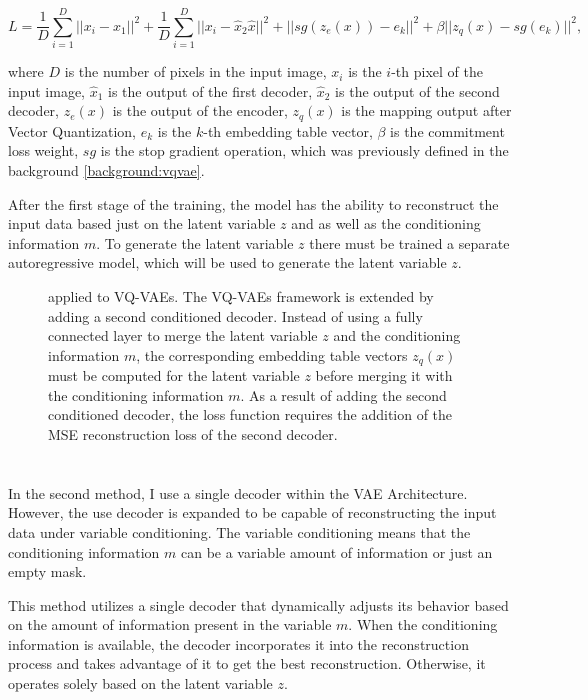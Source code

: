 \[ L = \frac{1}{D} \sum_{i=1}^{D} ||x_i - \hat{x}_1 ||^2 + \frac{1}{D} \sum_{i=1}^{D} || x_i - \hat{x}_2 \hat{x} ||^2 + || sg(z_e(x)) - e_k ||^2 + \beta || z_q(x) - sg(e_k) ||^2 , \]

where $D$ is the number of pixels in the input image, $x_i$ is the $i$-th pixel
of the input image, $\hat{x}_1$ is the output of the first decoder, $\hat{x}_2$
is the output of the second decoder, $z_e(x)$ is the output of the encoder,
$z_q(x)$ is the mapping output after Vector Quantization, $e_k$ is the $k$-th
embedding table vector, $\beta$ is the commitment loss weight, $sg$ is the stop
gradient operation, which was previously defined in the background \autoref{background:vqvae}.

After the first stage of the training, the model has the ability to reconstruct
the input data based just on the latent variable $z$ and as well as the
conditioning information $m$. To generate the latent variable $z$ there must be
trained a separate autoregressive model, which will be used to generate the
latent variable $z$.

\begin{figure}[H]
    \centering
    
    \caption[ applied to VQ-VAEs.]%
    {
         applied to VQ-VAEs. The VQ-VAEs framework is extended by adding a second conditioned decoder. Instead of using a fully connected layer to merge the latent variable $z$ and the conditioning information $m$, the corresponding embedding table vectors $z_q(x)$ must be computed for the latent variable $z$ before merging it with the conditioning information $m$. As a result of adding the second conditioned decoder, the loss function requires the addition of the MSE reconstruction loss of the second decoder.
    }\label{SCVQVAE2DFigure}
\end{figure}

\section{}

In the second method, I use a single decoder within the VAE Architecture.
However, the use decoder is expanded to be capable of reconstructing the input
data under variable conditioning. The variable conditioning means that the
conditioning information $m$ can be a variable amount of information or just an
empty mask.

This method utilizes a single decoder that dynamically adjusts its behavior
based on the amount of information present in the variable $m$. When the
conditioning information is available, the decoder incorporates it into the
reconstruction process and takes advantage of it to get the best
reconstruction. Otherwise, it operates solely based on the latent variable $z$.

